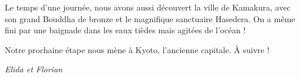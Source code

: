 Le temps d'une journée, nous avons aussi découvert la ville de Kamakura,
avec son grand Bouddha de bronze et le magnifique sanctuaire Hasedera.
On a même fini par une baignade dans les eaux tièdes mais agitées de
l'océan !

Notre prochaine étape nous mène à Kyoto, l'ancienne capitale. À suivre !

\emph{Elida et Florian}
